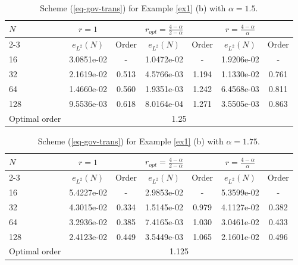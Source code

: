 \documentclass[11pt]{article}
\numberwithin{equation}{section}
\begin{document}
\begin{table}[!ht]
\caption{Scheme (\ref{eq-gov-trans}) for Example \ref{ex1} (b) with $\alpha=1.5$.}
\renewcommand{\arraystretch}{1}
\def\temptablewidth{1\textwidth}
\begin{center}
 \begin{tabular*}{\temptablewidth}{@{\extracolsep{\fill}}lcccccc}\hline
 $N$ & $r=1$   &   &$r_{opt}=\frac{4-\alpha}{2-\alpha}$      &     &$r=\frac{4-\alpha}{\alpha}$  &    \\ 
 \cline{2-3}\cline{4-5}\cline{6-7}
 & $e_{L^{2}}(N)$         &Order     &$e_{L^{2}}(N)$    &Order    &$e_{L^{2}}(N)$ &Order     \\ \hline
 16 &3.0851e-02     &-      &1.0472e-02   &-       &1.9206e-02  &-  \\ 
 32 &2.1619e-02     &0.513  &4.5766e-03   &1.194   &1.1330e-02  &0.761    \\ 
 64 &1.4660e-02     &0.560  &1.9351e-03   &1.242   &6.4568e-03  &0.811 \\ 
 128 &9.5536e-03    &0.618  &8.0164e-04   &1.271   &3.5505e-03  &0.863    \\ 
 Optimal order  &\multicolumn{6}{c}{1.25} \\ \hline
\end{tabular*}
\end{center}
\end{table}

\begin{table}[!ht]
\caption{Scheme (\ref{eq-gov-trans}) for Example \ref{ex1} (b) with $\alpha=1.75$.}
\renewcommand{\arraystretch}{1}
\def\temptablewidth{1\textwidth}
\begin{center}
 \begin{tabular*}{\temptablewidth}{@{\extracolsep{\fill}}lcccccc}\hline
 $N$ & $r=1$   &   &$r_{opt}=\frac{4-\alpha}{2-\alpha}$      &     &$r=\frac{4-\alpha}{\alpha}$  &    \\ 
 \cline{2-3}\cline{4-5}\cline{6-7}
 & $e_{L^{2}}(N)$         &Order     &$e_{L^{2}}(N)$    &Order    &$e_{L^{2}}(N)$ &Order     \\ \hline
 16 &5.4227e-02     &-      &2.9853e-02   &-       &5.3599e-02  &-  \\ 
 32 &4.3015e-02     &0.334  &1.5145e-02   &0.979   &4.1127e-02  &0.382    \\ 
 64 &3.2936e-02     &0.385  &7.4165e-03   &1.030   &3.0461e-02  &0.433 \\ 
 128 &2.4123e-02    &0.449  &3.5449e-03   &1.065   &2.1601e-02  &0.496    \\ 
 Optimal order  &\multicolumn{6}{c}{1.125} \\ \hline
\end{tabular*}
\end{center}
\end{table}
\end{document}
